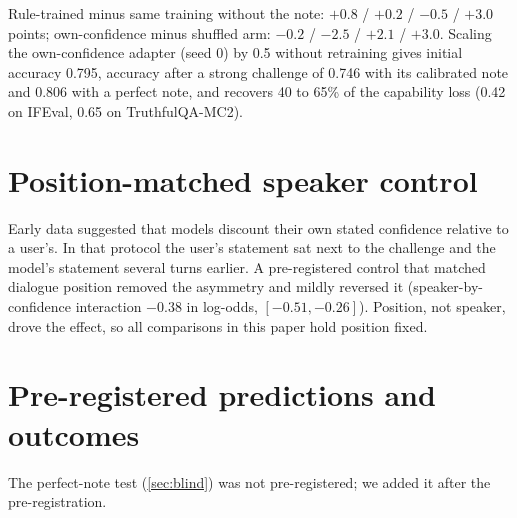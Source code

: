 \documentclass{article} %
\begin{document}
Rule-trained minus same training without the note: $+0.8$ / $+0.2$ / $-0.5$ / $+3.0$ points; own-confidence minus shuffled arm: $-0.2$ / $-2.5$ / $+2.1$ / $+3.0$. Scaling the own-confidence adapter (seed 0) by 0.5 without retraining gives initial accuracy 0.795, accuracy after a strong challenge of 0.746 with its calibrated note and 0.806 with a perfect note, and recovers 40 to 65\% of the capability loss (0.42 on IFEval, 0.65 on TruthfulQA-MC2).

\section{Position-matched speaker control}
\label{app:position}

Early data suggested that models discount their own stated confidence relative to a user's. In that protocol the user's statement sat next to the challenge and the model's statement several turns earlier. A pre-registered control that matched dialogue position removed the asymmetry and mildly reversed it (speaker-by-confidence interaction $-0.38$ in log-odds, $[-0.51, -0.26]$). Position, not speaker, drove the effect, so all comparisons in this paper hold position fixed.

\clearpage
\section{Pre-registered predictions and outcomes}
\label{app:prereg}

The perfect-note test (\cref{sec:blind}) was not pre-registered; we added it after the pre-registration.
\end{document}
